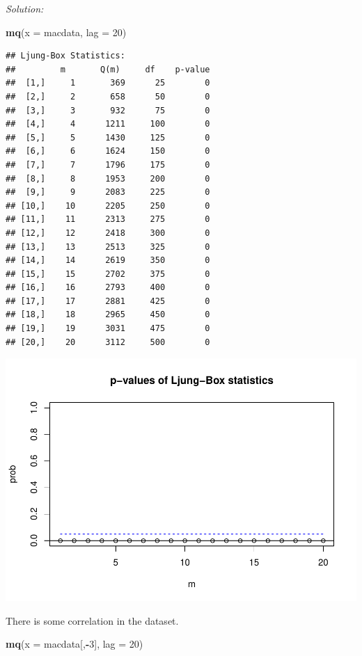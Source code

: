 \documentclass[12pt,a4paper]{article}
\newenvironment{Shaded}{\begin{snugshade}}{\end{snugshade}}
\newcommand{\DataTypeTok}[1]{\textcolor[rgb]{0.13,0.29,0.53}{#1}}
\newcommand{\DecValTok}[1]{\textcolor[rgb]{0.00,0.00,0.81}{#1}}
\newcommand{\KeywordTok}[1]{\textcolor[rgb]{0.13,0.29,0.53}{\textbf{#1}}}
\newcommand{\NormalTok}[1]{#1}
\newcommand{\OperatorTok}[1]{\textcolor[rgb]{0.81,0.36,0.00}{\textbf{#1}}}
\begin{document}
\emph{Solution:}

\begin{Shaded}
\begin{Highlighting}[]
\KeywordTok{mq}\NormalTok{(}\DataTypeTok{x =}\NormalTok{ macdata, }\DataTypeTok{lag =} \DecValTok{20}\NormalTok{)}
\end{Highlighting}
\end{Shaded}

\begin{verbatim}
## Ljung-Box Statistics:  
##         m       Q(m)     df    p-value
##  [1,]     1       369      25        0
##  [2,]     2       658      50        0
##  [3,]     3       932      75        0
##  [4,]     4      1211     100        0
##  [5,]     5      1430     125        0
##  [6,]     6      1624     150        0
##  [7,]     7      1796     175        0
##  [8,]     8      1953     200        0
##  [9,]     9      2083     225        0
## [10,]    10      2205     250        0
## [11,]    11      2313     275        0
## [12,]    12      2418     300        0
## [13,]    13      2513     325        0
## [14,]    14      2619     350        0
## [15,]    15      2702     375        0
## [16,]    16      2793     400        0
## [17,]    17      2881     425        0
## [18,]    18      2965     450        0
## [19,]    19      3031     475        0
## [20,]    20      3112     500        0
\end{verbatim}

\includegraphics{solution_exercise_5_files/figure-latex/unnamed-chunk-5-1.pdf}

There is some correlation in the dataset.

\begin{Shaded}
\begin{Highlighting}[]
\KeywordTok{mq}\NormalTok{(}\DataTypeTok{x =}\NormalTok{ macdata[,}\OperatorTok{-}\DecValTok{3}\NormalTok{], }\DataTypeTok{lag =} \DecValTok{20}\NormalTok{)}
\end{Highlighting}
\end{Shaded}
\end{document}
